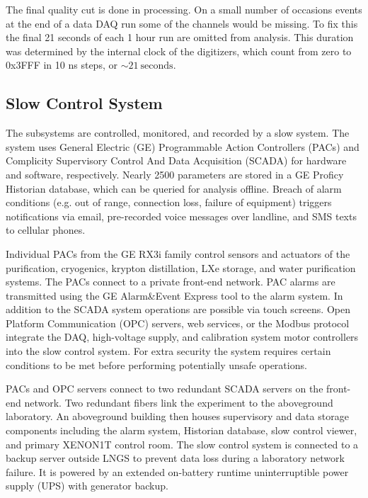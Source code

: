 The final quality cut is done in processing.  On a small number of occasions events at the end of a data DAQ run some of the channels
would be missing.  To fix this the final 21 seconds of each 1 hour run are omitted from analysis.  This duration was determined by the
internal clock of the digitizers, which count from zero to 0x3FFF in 10 ns steps, or ${\sim} 21\ \mathrm{seconds}$.



\subsection{Slow Control System}
\label{subsec:xenon1t_detector_slow_control}
The subsystems are controlled, monitored, and recorded by a slow system.  The system uses General Electric (GE) Programmable
Action Controllers (PACs) and Complicity Supervisory Control And Data Acquisition (SCADA) for hardware and software, respectively.  Nearly
2500 parameters are stored in a GE Proficy Historian database, which can be queried for analysis offline.  Breach of alarm conditions
(e.g. out of range, connection loss, failure of equipment) triggers notifications via email, pre-recorded voice messages over landline,
and SMS texts to cellular phones.

Individual PACs from the GE RX3i family control sensors and actuators of the purification, cryogenics, krypton distillation,
LXe storage, and water purification systems.  The PACs connect to a private front-end network.  PAC alarms are transmitted using the
GE Alarm\&Event Express tool to the alarm system.  In addition to the SCADA system operations are possible via touch screens.  Open
Platform Communication (OPC) servers, web services, or the Modbus protocol integrate the DAQ, high-voltage supply, and calibration
system motor controllers into the slow control system.  For extra security the system requires certain conditions to be met before
performing potentially unsafe operations.

PACs and OPC servers connect to two redundant SCADA servers on the front-end network.  Two redundant fibers link the experiment to the
aboveground laboratory.  An aboveground building then houses supervisory and data storage components including the alarm system, Historian
database, slow control viewer, and primary XENON1T control room.  The slow control system is connected to a backup server outside LNGS
to prevent data loss during a laboratory network failure.  It is powered by an extended on-battery runtime
uninterruptible power supply (UPS) with generator backup.



